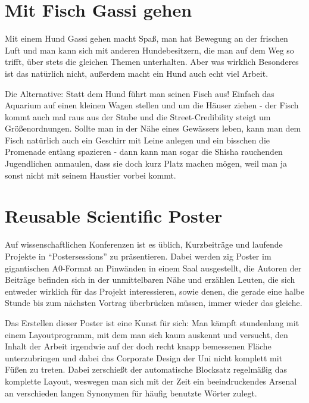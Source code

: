 \documentclass[a5paper,pagesize,10pt,bibtotoc,pointlessnumbers,normalheadings,DIV=9,twoside=false]{scrbook}
\begin{document}

\chapter{Mit Fisch Gassi gehen}

Mit einem Hund Gassi gehen macht Spaß, man hat Bewegung an der frischen Luft und man kann sich mit anderen Hundebesitzern, die man auf dem Weg so trifft, über stets die gleichen Themen unterhalten. Aber was wirklich Besonderes ist das natürlich nicht, außerdem macht ein Hund auch echt viel Arbeit.

Die Alternative:
Statt dem Hund führt man seinen Fisch aus!
Einfach das Aquarium auf einen kleinen Wagen stellen und um die Häuser ziehen - der Fisch kommt auch mal raus aus der Stube und die Street-Credibility steigt um Größenordnungen.
Sollte man in der Nähe eines Gewässers leben, kann man dem Fisch natürlich auch ein Geschirr mit Leine anlegen und ein bisschen die Promenade entlang spazieren - dann kann man sogar die Shisha rauchenden Jugendlichen anmaulen, dass sie doch kurz Platz machen mögen, weil man ja sonst nicht mit seinem Haustier vorbei kommt.


\chapter{Reusable Scientific Poster}

Auf wissenschaftlichen Konferenzen ist es üblich, Kurzbeiträge und laufende Projekte in ``Postersessions'' zu präsentieren.
Dabei werden zig Poster im gigantischen A0-Format an Pinwänden in einem Saal ausgestellt, die Autoren der Beiträge befinden sich in der unmittelbaren Nähe und erzählen Leuten, die sich entweder wirklich für das Projekt interessieren, sowie denen, die gerade eine halbe Stunde bis zum nächsten Vortrag überbrücken müssen, immer wieder das gleiche.

Das Erstellen dieser Poster ist eine Kunst für sich:
Man kämpft stundenlang mit einem Layoutprogramm, mit dem man sich kaum auskennt und versucht, den Inhalt der Arbeit irgendwie auf der doch recht knapp bemessenen Fläche unterzubringen und dabei das Corporate Design der Uni nicht komplett mit Füßen zu treten.
Dabei zerschießt der automatische Blocksatz regelmäßig das komplette Layout, weswegen man sich mit der Zeit ein beeindruckendes Arsenal an verschieden langen Synonymen für häufig benutzte Wörter zulegt.
\end{document}
